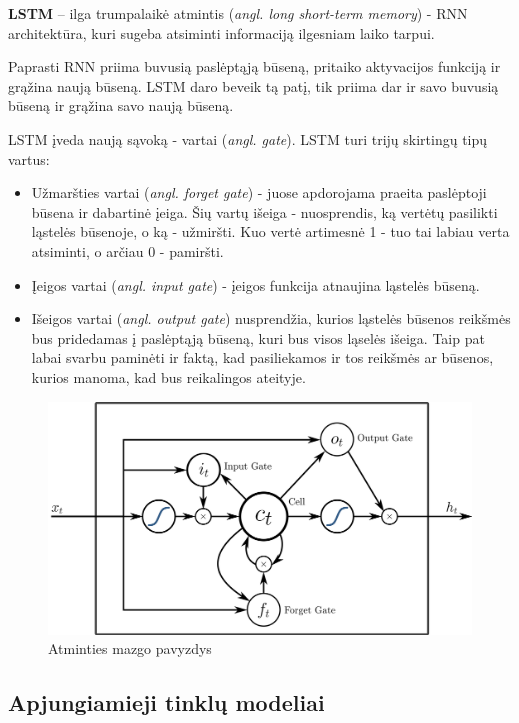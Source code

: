 \documentclass{VUMIFPSbakalaurinis}
\begin{document}
\textbf{LSTM} – ilga trumpalaikė atmintis (\textit{angl. long short-term memory}) - RNN architektūra, kuri sugeba atsiminti informaciją ilgesniam laiko tarpui. 

Paprasti RNN priima buvusią paslėptąją būseną, pritaiko aktyvacijos funkciją ir grąžina naują būseną. LSTM daro beveik tą patį, tik priima dar ir savo buvusią būseną ir grąžina savo naują būseną. 

LSTM įveda naują sąvoką - vartai (\textit{angl. gate}). LSTM turi trijų skirtingų tipų vartus:

\begin{itemize}
	\item Užmaršties vartai (\textit{angl. forget gate}) - juose apdorojama praeita paslėptoji būsena ir dabartinė įeiga. Šių vartų išeiga - nuosprendis, ką vertėtų pasilikti ląstelės būsenoje, o ką - užmiršti. Kuo vertė artimesnė 1 - tuo tai labiau verta atsiminti, o arčiau 0 - pamiršti.
	\item Įeigos vartai (\textit{angl. input gate}) - įeigos funkcija atnaujina ląstelės būseną.
	\item Išeigos vartai (\textit{angl. output gate}) nusprendžia, kurios ląstelės būsenos reikšmės bus pridedamas į paslėptąją būseną, kuri bus visos ląselės išeiga. Taip pat labai svarbu paminėti ir faktą, kad pasiliekamos ir tos reikšmės ar būsenos, kurios manoma, kad bus reikalingos ateityje.
\end{itemize}

\begin{figure}[H]
	\centering
	\includegraphics[scale=0.12]{img/lstm}
	\caption{Atminties mazgo pavyzdys}
	\label{img:lstm}
\end{figure}

\subsection{Apjungiamieji tinklų modeliai}
\end{document}
